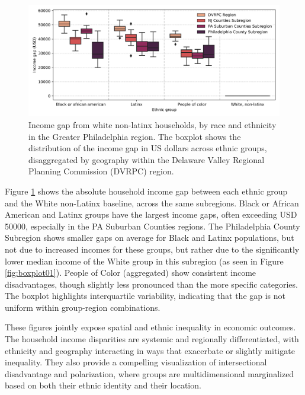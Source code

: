 \documentclass[11pt]{article}
\begin{document}
\begin{figure}[ht!]
    \centering
    \includegraphics[width=\linewidth]{figures/figbp_02.png}
    \caption{Income gap from white non-latinx households, by race and ethnicity in the Greater Philadelphia region. The boxplot shows the distribution of the income gap in US dollars across ethnic groups, disaggregated by geography within the Delaware Valley Regional Planning Commission (DVRPC) region.}
    \label{fig:boxplot02}
\end{figure}

Figure \ref{fig:boxplot02} shows the absolute household income gap between each ethnic group and the White non-Latinx baseline, across the same subregions. Black or African American and Latinx groups have the largest income gaps, often exceeding USD 50000, especially in the PA Suburban Counties regions. The Philadelphia County Subregion shows smaller gaps on average for Black and Latinx populations, but not due to increased incomes for these groups, but rather due to the significantly lower median income of the White group in this subregion (as seen in Figure \ref{fig:boxplot01}). People of Color (aggregated) show consistent income disadvantages, though slightly less pronounced than the more specific categories. The boxplot highlights interquartile variability, indicating that the gap is not uniform within group-region combinations.

These figures jointly expose spatial and ethnic inequality in economic outcomes. The household income disparities are systemic and regionally differentiated, with ethnicity and geography interacting in ways that exacerbate or slightly mitigate inequality. They also provide a compelling visualization of intersectional disadvantage and polarization, where groups are multidimensional marginalized based on both their ethnic identity and their location.
\end{document}
